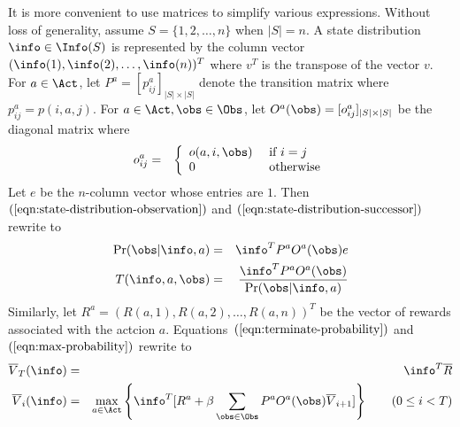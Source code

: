 It is more convenient to use matrices to simplify various
expressions. Without loss of generality, assume $S = \{ 1, 2, \ldots,
n \}$ when $|S| = n$. A state distribution $\info \in \Info (S)$ is
represented by the column vector $(\info (1), \info (2), \ldots, \info
(n))^T$  where $v^T$ is the transpose of the vector $v$.
For $a \in \Act$, let $P^a = [p_{ij}^a]_{|S|
  \times |S|}$ denote the transition matrix where $p_{ij}^a = p (i, a,
j)$. For $a \in \Act, \obs \in \Obs$, let $O^a (\obs) = [
o^a_{ij} ]_{|S| \times |S|}$ be the diagonal matrix where
\begin{eqnarray*}
  o^a_{ij} & = & \left\{
                 \begin{array}{ll}
                   o (a, i, \obs) & \textmd{ if } i = j\\
                   0 & \textmd{ otherwise}
                 \end{array}
                 \right.
\end{eqnarray*}
Let $e$ be the $n$-column vector whose entries are $1$.
Then $(\ref{eqn:state-distribution-observation})$ and
$(\ref{eqn:state-distribution-successor})$ rewrite to
\begin{eqnarray}
  \Pr (\obs | \info, a) & = & \info^T P^a O^a (\obs) e \\
  T (\info, a, \obs) & = & \frac{\info^T P^a O^a (\obs)}
                                {\Pr (\obs | \info, a)}
\end{eqnarray}
Similarly, let $R^a = (R (a, 1), R (a, 2), \ldots, R (a, n))^T$ be the
vector of rewards associated with the actcion
$a$. Equations~$(\ref{eqn:terminate-probability})$ and 
$(\ref{eqn:max-probability})$ rewrite to 
\begin{eqnarray}
  \overline{V}_{T} (\info) & = & \info^T \overline{R}\\
  \overline{V}_i (\info) & = &
        \max_{a \in \Act} \left\{ \info^T [
        R^a + 
        \beta \sum_{\obs \in \Obs}
          P^a O^a (\obs) \overline{V}_{i+1} ] \right\}
          \hspace{2em}(0 \leq i < T)
\end{eqnarray}

